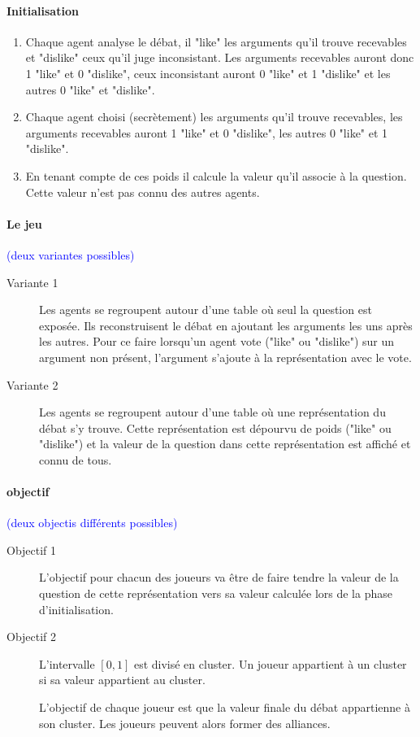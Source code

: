 \documentclass[12pt]{article}
\theoremstyle{defi}
\theoremstyle{not}
\theoremstyle{prob}
\begin{document}
  \paragraph{Initialisation}
  \begin{enumerate}
\color{blue}
    \item Chaque agent analyse le débat, il "like" les arguments qu'il trouve recevables et "dislike" ceux qu'il juge inconsistant.
    Les arguments recevables auront donc 1 "like" et 0 "dislike", ceux inconsistant auront 0 "like" et 1 "dislike" et les autres 0 "like" et "dislike".
\color{red}
    \item Chaque agent choisi (secrètement) les arguments qu'il trouve recevables, les arguments recevables auront 1 "like" et 0 "dislike", les autres 0 "like" et 1 "dislike".
\color{black}
    \item En tenant compte de ces poids il calcule la valeur qu'il associe à la question. Cette valeur n'est pas connu des autres agents.
  \end{enumerate}

  \paragraph{Le jeu}\textcolor{blue}{(deux variantes possibles)}

\color{blue}
    \begin{description}
      \item[Variante 1] Les agents se regroupent autour d'une table où seul la question est exposée. Ils reconstruisent le débat en ajoutant les arguments les uns après les autres. Pour ce faire lorsqu'un agent vote ("like" ou "dislike") sur un argument non présent, l'argument s'ajoute à la représentation avec le vote.

\color{black}
      \item[Variante 2] Les agents se regroupent autour d'une table où une représentation du débat s'y trouve. Cette représentation est dépourvu de poids ("like" ou "dislike") et la valeur de la question dans cette représentation est affiché et connu de tous.
    \end{description}
\color{black}
  \paragraph{objectif\\}\textcolor{blue}{(deux objectis différents possibles)}
  \begin{description}
    \item[Objectif 1] L'objectif pour chacun des joueurs va être de faire tendre la valeur de la question de cette représentation vers sa valeur calculée lors de la phase d'initialisation.
\color{blue}
    \item[Objectif 2] L'intervalle $[0, 1]$ est divisé en cluster. Un joueur appartient à un cluster si sa valeur appartient au cluster.

    L'objectif de chaque joueur est que la valeur finale du débat appartienne à son cluster. Les joueurs peuvent alors former des alliances.
\color{black}
  \end{description}
\end{document}
